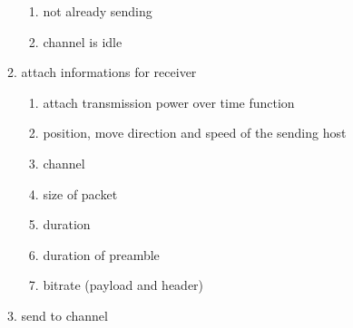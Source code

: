 \begin{enumerate}
\begin{enumerate}
\begin{enumerate}
		\item not already sending \label{sendPreqSending}
		\item channel is idle \label{sendPreqIdle}		
		\end{enumerate}
	\item attach informations for receiver
		\begin{enumerate}
		\item attach transmission power over time function \label{sendInfoTXPower}
		\item position, move direction and speed of the sending host \label{sendInfoMove}
		\item channel \label{sendInfoChannel}
		\item size of packet \label{sendInfoSize}
		\item duration \label{sendInfoDuration}
		\item duration of preamble \label{sendInfoPreambleDuration}
		\item bitrate (payload and header) \label{sendInfoBitrate}
		\end{enumerate}	
	\item send to channel \label{sendToChannel}
	

\end{enumerate}
\end{enumerate}
